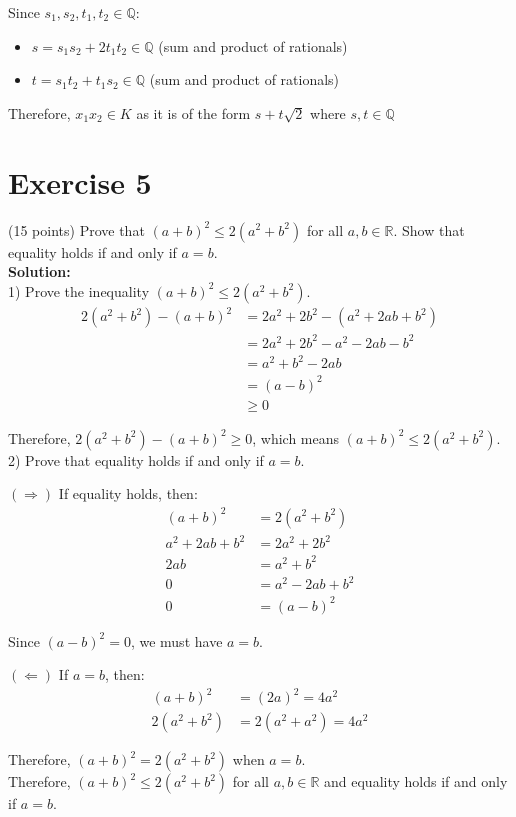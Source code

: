 \documentclass{article}
\begin{document}
Since $s_1, s_2, t_1, t_2 \in \mathbb{Q}$:
\begin{itemize}
\item $s = s_1s_2 + 2t_1t_2 \in \mathbb{Q}$ (sum and product of rationals)
\item $t = s_1t_2 + t_1s_2 \in \mathbb{Q}$ (sum and product of rationals)
\end{itemize}

Therefore, $x_1x_2 \in K$ as it is of the form $s + t\sqrt{2}$ where $s, t \in \mathbb{Q}$

\newpage

\section*{Exercise 5}
(15 points) Prove that $(a + b)^2 \leq 2(a^2 + b^2)$ for all $a,b \in \mathbb{R}$. Show that equality holds if and only if $a = b$. \\

\textbf{Solution:} \\

1) Prove the inequality $(a + b)^2 \leq 2(a^2 + b^2)$.
\begin{align*}
2(a^2 + b^2) - (a + b)^2 &= 2a^2 + 2b^2 - (a^2 + 2ab + b^2) \\
&= 2a^2 + 2b^2 - a^2 - 2ab - b^2 \\
&= a^2 + b^2 - 2ab \\
&= (a - b)^2 \\
&\geq 0
\end{align*}

Therefore, $2(a^2 + b^2) - (a + b)^2 \geq 0$, which means $(a + b)^2 \leq 2(a^2 + b^2)$. \\

2) Prove that equality holds if and only if $a = b$.

$(\Rightarrow)$ If equality holds, then:
\begin{align*}
(a + b)^2 &= 2(a^2 + b^2) \\
a^2 + 2ab + b^2 &= 2a^2 + 2b^2 \\
2ab &= a^2 + b^2 \\
0 &= a^2 - 2ab + b^2 \\
0 &= (a - b)^2
\end{align*}

Since $(a - b)^2 = 0$, we must have $a = b$.

$(\Leftarrow)$ If $a = b$, then:
\begin{align*}
(a + b)^2 &= (2a)^2 = 4a^2 \\
2(a^2 + b^2) &= 2(a^2 + a^2) = 4a^2
\end{align*}

Therefore, $(a + b)^2 = 2(a^2 + b^2)$ when $a = b$. \\

Therefore, $(a + b)^2 \leq 2(a^2 + b^2)$ for all $a,b \in \mathbb{R}$ and equality holds if and only if $a = b$.
\end{document}
